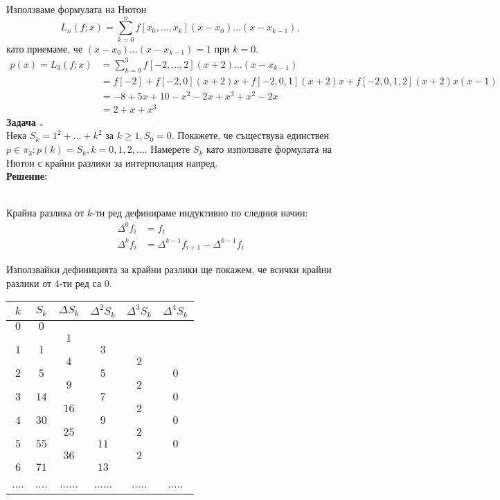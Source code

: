 \documentclass[12pt]{article}
\newcounter{problem}
\newcounter{solution}
\newcommand\problem{%
  \stepcounter{problem}%
  \textbf{Задача \theproblem.}~%
  \\
}
\newcommand\solution{%
  \textbf{Решение:}\\~%
}
\begin{document}
Използваме формулата на Нютон
\begin{equation*}
L_n(f;x) = \sum_{k=0}^nf[x_0,\dotso,x_k](x-x_0)\dotso(x-x_{k-1}),
\end{equation*}
като приемаме, че $(x-x_0)\dotso(x-x_{k-1}) = 1$ при $k=0$.
\begin{align*}
p(x)=L_3(f;x) &= \sum_{k=0}^3f[-2,\dotso,2](x+2)\dotso(x-x_{k-1})\\
&=f[-2]+f[-2,0](x+2)x+f[-2,0,1](x+2)x+f[-2,0,1,2](x+2)x(x-1)\\
&= -8 + 5x+10-x^2-2x+x^3+x^2-2x \\
&= \boxed{2+x+x^3}
\end{align*}
\problem
Нека $S_k=1^2+\ldots+k^2$ за $k\geq1, S_0=0$. Покажете, че съществува единствен $p\in\pi_3:p(k)=S_k, k=0,1,2,\ldots$. Намерете $S_k$ като използвате формулата на Нютон с крайни разлики за интерполация напред.\\
\solution
\begin{tcolorbox}[colback=red!5!white,colframe=red!75!black]
Крайна разлика от $k$-ти ред дефинираме индуктивно по следния начин:
\begin{align*}
\Delta^0f_i&=f_i\\
\Delta^kf_i&=\Delta^{k-1}f_{i+1}-\Delta^{k-1}f_i
\end{align*}
\end{tcolorbox}
Използвайки дефиницията за крайни разлики ще покажем, че всички крайни разлики от 4-ти ред са 0.\\
\begin{tabular}{|c c c c c c|}
\hline
$k$&$S_k$&$\Delta S_k$&$\Delta^2S_k$&$\Delta^3S_k$&$\Delta^4S_k$\\
\hline
$0$ & $0$  &      &      &     &     \\
    &      & $1$  &      &     &     \\
$1$ & $1$  &      & $3$  &     &     \\
    &      & $4$  &      & $2$ &     \\
$2$ & $5$  &      & $5$  &     & $0$ \\
    &      & $9$  &      & $2$ &     \\
$3$ & $14$ &      & $7$  &     & $0$ \\
    &      & $16$ &      & $2$ &     \\
$4$ & $30$ &      & $9$  &     & $0$ \\
    &      & $25$ &      & $2$ &     \\
$5$ & $55$ &      & $11$ &     & $0$ \\
    &      & $36$ &      & $2$ &     \\
$6$ & $71$ &      & $13$ &     &     \\
....& .... &......&......&.....&.....\\
\hline
\end{tabular}\\
\end{document}
